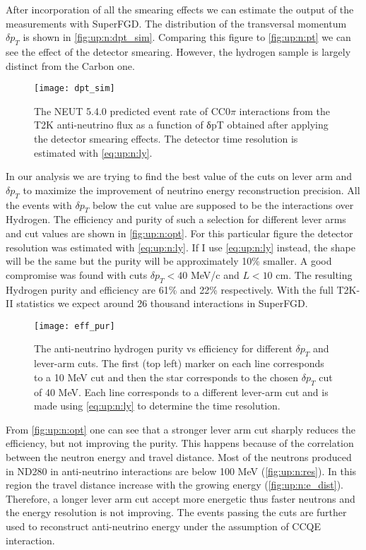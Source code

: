 \documentclass[main.tex]{subfiles}
\begin{document}
After incorporation of all the smearing effects we can estimate the output of the measurements with SuperFGD. The distribution of the transversal momentum $\delta p_T$ is shown in \autoref{fig:up:n:dpt_sim}. Comparing this figure to \autoref{fig:up:n:pt} we can see the effect of the detector smearing. However, the hydrogen sample is largely distinct from the Carbon one.

\begin{figure}[!ht]
  \centering
  \texttt{[image: dpt\_sim]}
  \caption{The NEUT 5.4.0 predicted event rate of CC0$\pi$ interactions from the T2K anti-neutrino flux as a function of δpT obtained after applying the detector smearing effects. The detector time resolution is estimated with \autoref{eq:up:n:ly}.}
  \label{fig:up:n:dpt_sim}
\end{figure}

In our analysis we are trying to find the best value of the cuts on lever arm and $\delta p_T$ to maximize the improvement of neutrino energy reconstruction precision. All the events with $\delta p_T$ below the cut value are supposed to be the interactions over Hydrogen. The efficiency and purity of such a selection for different lever arms and cut values are shown in \autoref{fig:up:n:opt}. For this particular figure the detector resolution was estimated with \autoref{eq:up:n:ly}. If I use \autoref{eq:up:n:ly} instead, the shape will be the same but the purity will be approximately 10\% smaller. A good compromise was found with cuts $\delta p_T < 40$ MeV/c and $L < 10$ cm. The resulting Hydrogen purity and efficiency are 61\% and 22\% respectively. With the full T2K-II statistics we expect around 26 thousand interactions in SuperFGD.

\begin{figure}[!ht]
  \centering
  \texttt{[image: eff\_pur]}
  \caption{The anti-neutrino hydrogen purity vs efficiency for different $\delta p_T$ and lever-arm cuts. The first (top left) marker on each line corresponds to a 10 MeV cut and then the star corresponds to the chosen $\delta p_T$ cut of 40 MeV. Each line corresponds to a different lever-arm cut and is made using \autoref{eq:up:n:ly} to determine the time resolution.}
  \label{fig:up:n:opt}
\end{figure}

From \autoref{fig:up:n:opt} one can see that a stronger lever arm cut sharply reduces the efficiency, but not improving the purity. This happens because of the correlation between the neutron energy and travel distance. Most of the neutrons produced in ND280 in anti-neutrino interactions are below 100 MeV (\autoref{fig:up:n:res}). In this region the travel distance increase with the growing energy (\autoref{fig:up:n:e_dist}). Therefore, a longer lever arm cut accept more energetic thus faster neutrons and the energy resolution is not improving. The events passing the cuts are further used to reconstruct anti-neutrino energy under the assumption of CCQE interaction.
\end{document}

